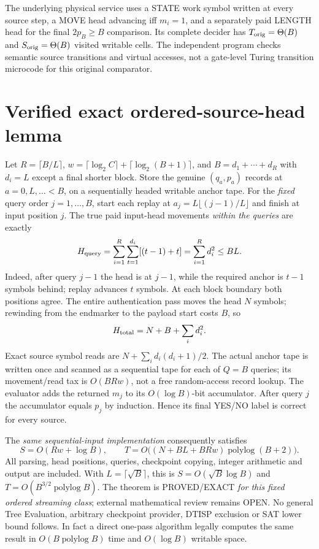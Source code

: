 \documentclass[11pt]{article}
\begin{document}
The underlying physical service uses a STATE work symbol written
at every source step, a MOVE head advancing iff \(m_i=1\), and a
separately paid LENGTH head for the final \(2p_B\ge B\) comparison.
Its complete decider has \(T_{\rm orig}=\Theta(B)\) and
\(S_{\rm orig}=\Theta(B)\) visited writable cells. The independent
program checks semantic source transitions and virtual accesses, not
a gate-level Turing transition microcode for this original comparator.

\section{Verified exact ordered-source-head lemma}
Let \(R=\lceil B/L\rceil\),
\(w=\lceil\log_2 C\rceil+\lceil\log_2(B+1)\rceil\), and
\(B=d_1+\cdots+d_R\) with \(d_i=L\) except a final shorter block.
Store the genuine \((q_a,p_a)\) records at
\(a=0,L,\ldots<B\), on a sequentially headed writable anchor tape.
For the \emph{fixed} query order \(j=1,\ldots,B\), start each replay
at \(a_j=L\lfloor(j-1)/L\rfloor\) and finish at input position \(j\).
The true paid input-head movements \emph{within the queries} are exactly
\[
H_{\rm query}
=\sum_{i=1}^R\sum_{t=1}^{d_i}[(t-1)+t]
=\sum_{i=1}^R d_i^2\le BL.
\]
Indeed, after query \(j-1\) the head is at \(j-1\), while
the required anchor is \(t-1\) symbols behind; replay advances \(t\)
symbols. At each block boundary both positions agree. The entire
authentication pass moves the head \(N\) symbols; rewinding from the
endmarker to the payload start costs \(B\), so
\[
H_{\rm total}=N+B+\sum_i d_i^2.
\]
Exact source symbol reads are \(N+\sum_i d_i(d_i+1)/2\).
The actual anchor tape is written once and scanned as a sequential
tape for each of \(Q=B\) queries; its movement/read tax is
\(O(BRw)\), not a free random-access record lookup.
The evaluator adds the returned \(m_j\) to its \(O(\log B)\)-bit
accumulator. After query \(j\) the accumulator equals \(p_j\) by
induction. Hence its final YES/NO label is correct for every source.

The \emph{same sequential-input implementation} consequently satisfies
\[
\boxed{\quad S=O(Rw+\log B),\qquad
T=O\bigl((N+BL+BRw)\operatorname{polylog}(B+2)\bigr).\quad}
\]
All parsing, head positions, queries, checkpoint copying, integer
arithmetic and output are included. With
\(L=\lceil\sqrt B\rceil\), this is
\(S=O(\sqrt B\log B)\) and
\(T=O(B^{3/2}\operatorname{polylog}B)\).
The theorem is PROVED/EXACT \emph{for this fixed ordered streaming class};
external mathematical review remains OPEN. No general Tree Evaluation,
arbitrary checkpoint provider, DTISP exclusion or SAT lower bound follows.
In fact a direct one-pass algorithm legally computes the same result
in \(O(B\operatorname{polylog}B)\) time and \(O(\log B)\) writable space.
\end{document}
